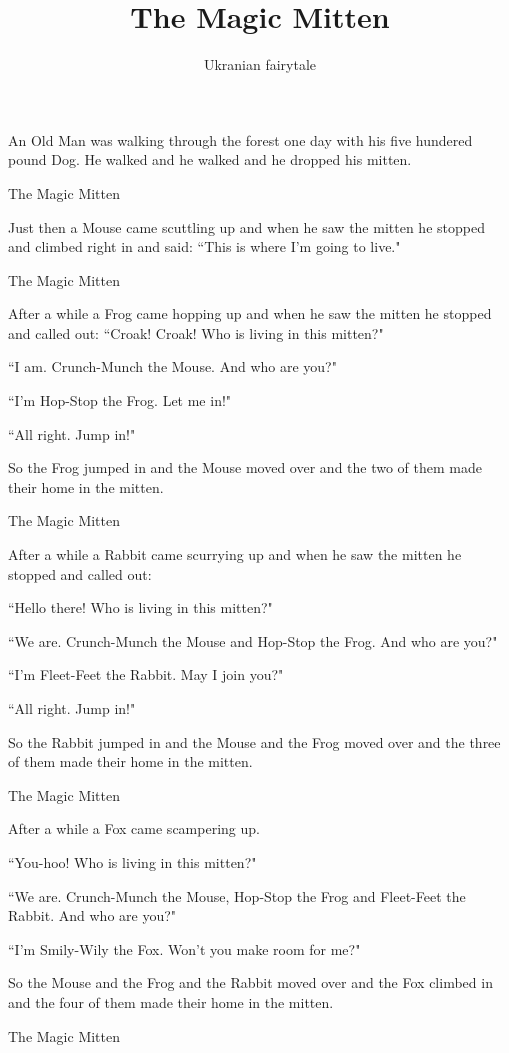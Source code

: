 \documentclass{article}
\title{The Magic Mitten}
\author{Ukranian fairytale}
\begin{document}
\maketitle

An Old Man was walking through the forest one day with his five hundered pound Dog. He walked and he walked and he dropped his mitten.

The Magic Mitten

Just then a Mouse came scuttling up and when he saw the mitten he stopped and climbed right in and said: ``This is where I'm going to live."

The Magic Mitten

After a while a Frog came hopping up and when he saw the mitten he stopped and called out:
``Croak! Croak! Who is living in this mitten?"

``I am. Crunch-Munch the Mouse. And who are you?"

``I'm Hop-Stop the Frog. Let me in!"

``All right. Jump in!"

So the Frog jumped in and the Mouse moved over and the two of them made their home in the mitten.

The Magic Mitten

After a while a Rabbit came scurrying up and when he saw the mitten he stopped and called out:

``Hello there! Who is living in this mitten?"

``We are. Crunch-Munch the Mouse and Hop-Stop the Frog. And who are you?"

``I'm Fleet-Feet the Rabbit. May I join you?"

``All right. Jump in!"

So the Rabbit jumped in and the Mouse and the Frog moved over and the three of them made their home in the mitten.

The Magic Mitten

After a while a Fox came scampering up.

``You-hoo! Who is living in this mitten?"

``We are. Crunch-Munch the Mouse, Hop-Stop the Frog and Fleet-Feet the Rabbit. And who are you?"

``I'm Smily-Wily the Fox. Won't you make room for me?"

So the Mouse and the Frog and the Rabbit moved over and the Fox climbed in and the four of them made their home in the mitten.

The Magic Mitten
\end{document}
